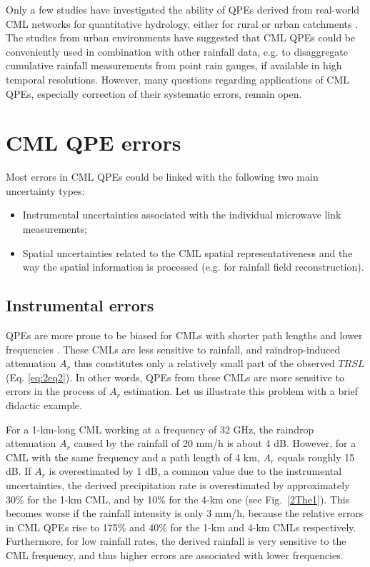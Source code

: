 \documentclass{ctuthesis}\usepackage[]{graphicx}\usepackage[]{color}
\begin{document}
Only a few studies have investigated the ability of QPEs derived from real-world CML networks for quantitative hydrology, either for rural \citep{brauerEffectDifferencesRainfall2016, cazzanigaCalculatingHydrologicalResponse2020, smiatekPotentialCommercialMicrowave2017}  or urban catchments \citep{dischImpactDifferentSources2019, stranskyRunoffPredictionUsing2018}. The studies from urban environments have suggested that CML QPEs could be conveniently used in combination with other rainfall data, e.g. to disaggregate cumulative rainfall measurements from point rain gauges, if available in high temporal resolutions. However, many questions regarding  applications of CML QPEs, especially correction of their systematic errors, remain open.



\section{CML QPE errors}

Most errors in CML QPEs could be linked with the following two main uncertainty types: 
\begin{itemize}
        \item Instrumental uncertainties associated with the individual microwave link measurements; 
        \item Spatial uncertainties related to the CML spatial representativeness and the way the spatial information is processed (e.g. for rainfall field reconstruction).
\end{itemize}


\subsection{Instrumental errors} \label{InstErr}

QPEs are more prone to be biased for CMLs with shorter path lengths and lower frequencies \citep{leijnseMicrowaveLinkRainfall2008}. These CMLs are less sensitive to rainfall, and raindrop-induced attenuation $A_r$ thus constitutes only a relatively small part of the observed $T\!R\!S\!L$ (Eq. \ref{eq:2eq2}). In other words, QPEs from these CMLs are more sensitive to errors in the process of $A_r$ estimation. Let us illustrate this problem with a brief didactic example. 

For a 1-km-long CML working at a frequency of 32 GHz, the raindrop attenuation $A_r$ caused by the rainfall of 20 mm/h is about 4 dB. However, for a CML with the same frequency and a path length of 4 km, $A_r$ equals roughly 15 dB. If $A_r$ is overestimated by 1 dB, a common value due to the instrumental uncertainties, the derived precipitation rate is overestimated by approximately 30\% for the 1-km CML, and by 10\% for the 4-km one (see Fig.~\ref{2The1}). This becomes worse if the rainfall intensity is only 3 mm/h, because the relative errors in CML QPEs rise to 175\% and 40\% for the 1-km and 4-km CMLs respectively. Furthermore, for low rainfall rates, the derived rainfall is very sensitive to the CML frequency, and thus higher errors are associated with lower frequencies.
\end{document}
